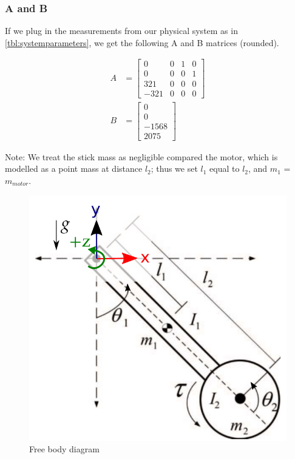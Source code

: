\documentclass[conference]{IEEEtran}
\begin{document}
\subsubsection{A and B}

If we plug in the measurements from our physical system as in
\cref{tbl:systemparameters}, we get the following A and B matrices (rounded).






\begin{align}
    A &= 
    \begin{bmatrix}
        0 & 0 & 1 & 0 \\
        0 & 0 & 0 & 1 \\
        321 & 0 & 0 & 0 \\
        -321  & 0 & 0 & 0
    \end{bmatrix} \\
    B &=  
    \begin{bmatrix}
        0 \\
        0 \\
        -1568\\
       2075 
    \end{bmatrix}
\end{align}

Note: We treat the stick mass as negligible compared the motor, which is
modelled as a point mass at distance $l_2$; thus we set $l_1$ equal to $l_2$,
and $m_1$ = $m_{motor}$.

\begin{figure}[!t]
    \centering
    \includegraphics[width=0.5\linewidth]{images/freebody.png}
    \caption{Free body diagram}
    \label{}
\end{figure}
\end{document}
